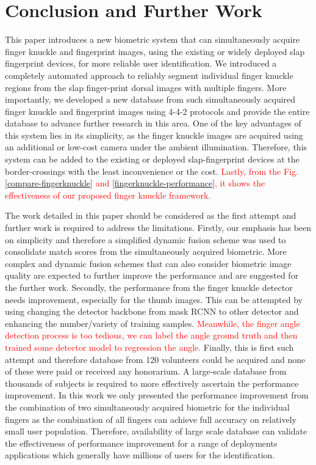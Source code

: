 \section{Conclusion and Further Work\label{conclusion}}

This paper introduces a new biometric system that can simultaneously acquire finger knuckle and fingerprint images, using the existing or widely deployed slap fingerprint devices, for more reliable user identification. We introduced a completely automated approach to reliably segment individual finger knuckle regions from the slap finger-print dorsal images with multiple fingers. More importantly, we developed a new database from such simultaneously acquired finger knuckle and fingerprint images using 4-4-2 protocols and provide \cite{datalink} the entire database to advance further research in this area. One of the key advantages of this system lies in its simplicity, as the finger knuckle images are acquired using an additional or low-cost camera under the ambient illumination. Therefore, this system can be added to the existing or deployed slap-fingerprint devices at the border-crossings with the least inconvenience or the cost. \textcolor{red}{Lastly, from the Fig. \ref{compare-fingerknuckle} and \ref{fingerknuckle-performance}, it shows the effectiveness of our proposed finger knuckle framework.}   

The work detailed in this paper should be considered as the first attempt and further work is required to address the limitations. Firstly, our emphasis has been on simplicity and therefore a simplified dynamic fusion scheme was used to consolidate match scores from the simultaneously acquired biometric. More complex and dynamic fusion schemes that can also consider biometric image quality are expected to further improve the performance and are suggested for the further work. Secondly, the performance from the finger knuckle detector needs improvement, especially for the thumb images. This can be attempted by using changing the detector backbone from mask RCNN to other detector \cite{redmon2016you} and enhancing the number/variety of training samples. \textcolor{red}{Meanwhile, the finger angle detection process is too tedious, we can label the angle ground truth and then trained some detector model to regression the angle.} Finally, this is first such attempt and therefore database from 120 volunteers could be acquired and none of these were paid or received any honorarium. A large-scale database from thousands of subjects is required to more effectively ascertain the performance improvement. In this work we only presented the performance improvement from the combination of two simultaneously acquired biometric for the individual fingers as the combination of all fingers can achieve full accuracy on relatively small user population. Therefore, availability of large scale database can validate the effectiveness of performance improvement for a range of deployments applications which generally have millions of users for the identification.
